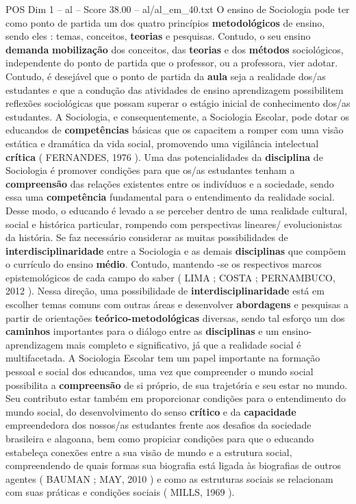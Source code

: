 \begin{textsample}{POS Dim 1 – al – Score 38.00 – al/al\_em\_40.txt}
O ensino de Sociologia pode ter como ponto de partida um dos quatro princípios \textbf{metodológicos} de ensino, sendo eles : temas, conceitos, \textbf{teorias} e pesquisas.
Contudo, o seu ensino \textbf{demanda} \textbf{mobilização} dos conceitos, das \textbf{teorias} e dos \textbf{métodos} sociológicos, independente do ponto de partida que o professor, ou a professora, vier adotar.
Contudo, é desejável que o ponto de partida da \textbf{aula} seja a realidade dos/as estudantes e que a condução das atividades de ensino aprendizagem possibilitem reflexões sociológicas que possam superar o estágio inicial de conhecimento dos/as estudantes.
A Sociologia, e consequentemente, a Sociologia Escolar, pode dotar os educandos de \textbf{competências} básicas que os capacitem a romper com uma visão estática e dramática da vida social, promovendo uma vigilância intelectual \textbf{crítica} ( FERNANDES, 1976 ).
Uma das potencialidades da \textbf{disciplina} de Sociologia é promover condições para que os/as estudantes tenham a \textbf{compreensão} das relações existentes entre os indivíduos e a sociedade, sendo essa uma \textbf{competência} fundamental para o entendimento da realidade social.
Desse modo, o educando é levado a se perceber dentro de uma realidade cultural, social e histórica particular, rompendo com perspectivas lineares/ evolucionistas da história.
Se faz necessário considerar as muitas possibilidades de \textbf{interdisciplinaridade} entre a Sociologia e as demais \textbf{disciplinas} que compõem o currículo do ensino \textbf{médio}.
Contudo, mantendo -se os respectivos marcos epistemológicos de cada campo do saber ( LIMA ; COSTA ; PERNAMBUCO, 2012 ).
Nessa direção, uma possibilidade de \textbf{interdisciplinaridade} está em escolher temas comuns com outras áreas e desenvolver \textbf{abordagens} e pesquisas a partir de orientações \textbf{teórico-metodológicas} diversas, sendo tal esforço um dos \textbf{caminhos} importantes para o diálogo entre as \textbf{disciplinas} e um ensino-aprendizagem mais completo e significativo, já que a realidade social é multifacetada.
A Sociologia Escolar tem um papel importante na formação pessoal e social dos educandos, uma vez que compreender o mundo social possibilita a \textbf{compreensão} de si próprio, de sua trajetória e seu estar no mundo.
Seu contributo estar também em proporcionar condições para o entendimento do mundo social, do desenvolvimento do senso \textbf{crítico} e da \textbf{capacidade} empreendedora dos nossos/as estudantes frente aos desafios da sociedade brasileira e alagoana, bem como propiciar condições para que o educando estabeleça conexões entre a sua visão de mundo e a estrutura social, compreendendo de quais formas sua biografia está ligada às biografias de outros agentes ( BAUMAN ; MAY, 2010 ) e como as estruturas sociais se relacionam com suas práticas e condições sociais ( MILLS, 1969 ).


\end{textsample}
